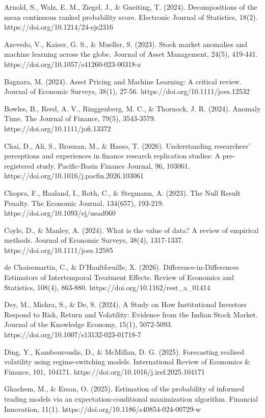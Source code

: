 \documentclass[12pt,a4paper]{article}
\begin{document}
Arnold, S., Walz, E. M., Ziegel, J., \& Gneiting, T. (2024). Decompositions of the mean continuous ranked probability score. Electronic Journal of Statistics, 18(2). https://doi.org/10.1214/24-ejs2316

Azevedo, V., Kaiser, G. S., \& Mueller, S. (2023). Stock market anomalies and machine learning across the globe. Journal of Asset Management, 24(5), 419-441. https://doi.org/10.1057/s41260-023-00318-z

Bagnara, M. (2024). Asset Pricing and Machine Learning: A critical review. Journal of Economic Surveys, 38(1), 27-56. https://doi.org/10.1111/joes.12532

Bowles, B., Reed, A. V., Ringgenberg, M. C., \& Thornock, J. R. (2024). Anomaly Time. The Journal of Finance, 79(5), 3543-3579. https://doi.org/10.1111/jofi.13372

Chai, D., Ali, S., Brosnan, M., \& Hasso, T. (2026). Understanding researchers' perceptions and experiences in finance research replication studies: A pre-registered study. Pacific-Basin Finance Journal, 96, 103061. https://doi.org/10.1016/j.pacfin.2026.103061

Chopra, F., Haaland, I., Roth, C., \& Stegmann, A. (2023). The Null Result Penalty. The Economic Journal, 134(657), 193-219. https://doi.org/10.1093/ej/uead060

Coyle, D., \& Manley, A. (2024). What is the value of data? A review of empirical methods. Journal of Economic Surveys, 38(4), 1317-1337. https://doi.org/10.1111/joes.12585

de Chaisemartin, C., \& D’Haultfœuille, X. (2026). Difference-in-Differences Estimators of Intertemporal Treatment Effects. Review of Economics and Statistics, 108(4), 863-880. https://doi.org/10.1162/rest\_a\_01414

Dey, M., Mishra, S., \& De, S. (2024). A Study on How Institutional Investors Respond to Risk, Return and Volatility: Evidence from the Indian Stock Market. Journal of the Knowledge Economy, 15(1), 5072-5093. https://doi.org/10.1007/s13132-023-01718-7

Ding, Y., Kambouroudis, D., \& McMillan, D. G. (2025). Forecasting realised volatility using regime-switching models. International Review of Economics \& Finance, 101, 104171. https://doi.org/10.1016/j.iref.2025.104171

Ghachem, M., \& Ersan, O. (2025). Estimation of the probability of informed trading models via an expectation-conditional maximization algorithm. Financial Innovation, 11(1). https://doi.org/10.1186/s40854-024-00729-w
\end{document}
